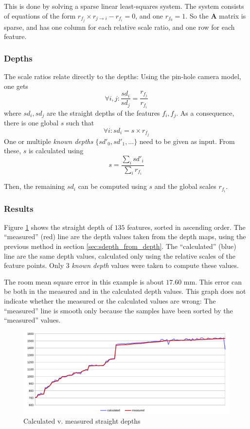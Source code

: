\documentclass{scrreprt}
\newcommand{\matr}[1]{\mathbf{#1}}
\begin{document}
This is done by solving a sparse linear least-squares system. The system consists of equations of the form $r_{f_j} \times r_{j\rightarrow i} - r_{f_i} = 0$, and one $r_{f_0} = 1$. So the $\matr{A}$ matrix is sparse, and has one column for each relative scale ratio, and one row for each feature.


\subsubsection{Depths}
The scale ratios relate directly to the depths: Using the pin-hole camera model, one gets
\begin{equation*}
\forall i,j : \frac{sd_i}{sd_j} = \frac{r_{f_j}}{r_{f_i}}
\end{equation*}
where $sd_i, sd_j$ are the straight depths of the features $f_i, f_j$. As a consequence, there is one global $s$ such that
\begin{equation*}
\forall i : sd_{i} = s \times r_{f_j}
\end{equation*}
One or multiple \emph{known depths} $\{ sd'_0, sd'_1, ... \}$ need to be given as input. From these, $s$ is calculated using 
\begin{equation*}
s = \frac{\sum_{i} sd'_{i}}{\sum_{i} r_{f_i}}
\end{equation*}

\noindent Then, the remaining $sd_i$ can be computed using $s$ and the global scales $r_{f_i}$.

\subsubsection{Results}
Figure \ref{fig:depthcomp} shows the straight depth of $135$ features, sorted in ascending order. The ``measured'' (red) line are the depth values taken from the depth maps, using the previous method in section \ref{sec:sdepth_from_depth}. The ``calculated'' (blue) line are the same depth values, calculated only using the relative scales of the feature points. Only $3$ \emph{known depth} values were taken to compute these values.

The room mean square error in this example is about $17.60 \text{ mm}$. This error can be both in the measured and in the calculated depth values. This graph does not indicate whether the measured or the calculated values are wrong: The ``measured'' line is smooth only because the samples have been sorted by the ``measured'' values.

\begin{figure}
\centering
\includegraphics[width=\textwidth]{depthcmp.pdf}
\caption{Calculated v. measured straight depths}
\label{fig:depthcomp}
\end{figure}
\end{document}
